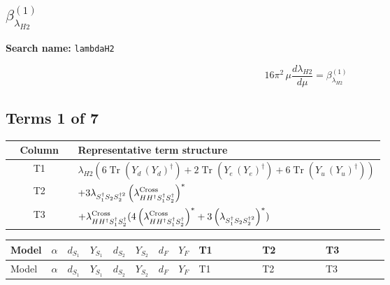\documentclass[8pt]{article}
\begin{document}
\begin{landscape}
\section*{$\beta_{\lambda_{H2}}^{(1)}$}
\noindent\textbf{Search name: }\texttt{lambdaH2}\par\smallskip
\[16\pi^2\,\mu\frac{d \lambda_{H2}}{d\mu}=\beta_{\lambda_{H2}}^{(1)}\]
\subsection*{Terms 1 of 7}
\begin{center}
\begin{tabular}{@{}c >{\raggedright\arraybackslash}p{0.82\linewidth}@{}}
\toprule
Column & Representative term structure \\
\midrule
T1 & \(\displaystyle {\lambda_{H2}} (6 \operatorname{Tr}\!\left({Y_d}\,\left({Y_d}\right)^{\dagger}\right)+2 \operatorname{Tr}\!\left({Y_e}\,\left({Y_e}\right)^{\dagger}\right)+6 \operatorname{Tr}\!\left({Y_u}\,\left({Y_u}\right)^{\dagger}\right))\) \\
\midrule
T2 & \(\displaystyle +3 {\lambda_{S_1^\dagger S_2 S_2^{\dagger 2}}} \left({\lambda_{H H^\dagger S_1^\dagger S_2^\dagger}^{\rm Cross}}\right)^{*}\) \\
\midrule
T3 & \(\displaystyle +{\lambda_{H H^\dagger S_1^\dagger S_2^\dagger}^{\rm Cross}} (4 \left({\lambda_{H H^\dagger S_1^\dagger S_2^\dagger}^{\rm Cross}}\right)^{*}+3 \left({\lambda_{S_1^\dagger S_2 S_2^{\dagger 2}}}\right)^{*})\) \\
\midrule
\bottomrule
\end{tabular}
\end{center}
\smallskip
\tiny
\begin{longtable}{@{}llcccccc >{\raggedright\arraybackslash}p{0.21\linewidth} >{\raggedright\arraybackslash}p{0.21\linewidth} >{\raggedright\arraybackslash}p{0.21\linewidth}@{}}
\toprule
Model & $\alpha$ & $d_{S_1}$ & $Y_{S_1}$ & $d_{S_2}$ & $Y_{S_2}$ & $d_F$ & $Y_F$ & T1 & T2 & T3 \\
\midrule
\endfirsthead
\toprule
Model & $\alpha$ & $d_{S_1}$ & $Y_{S_1}$ & $d_{S_2}$ & $Y_{S_2}$ & $d_F$ & $Y_F$ & T1 & T2 & T3 \\
\midrule
\endhead

\end{longtable}
\end{landscape}
\end{document}
